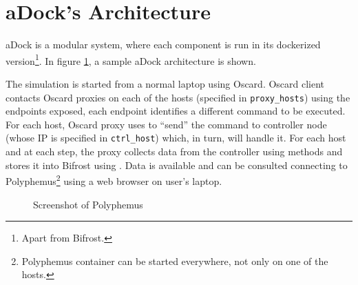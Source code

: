 \section{aDock's Architecture}
\label{sec:adock_arch}
aDock is a modular system, where each component is run in its dockerized version\footnote{Apart from Bifrost.}. In figure \ref{fig:adock_arch}, a sample aDock architecture is shown.

The simulation is started from a normal laptop using Oscard. Oscard client contacts Oscard proxies on each of the hosts (specified in \texttt{proxy\_hosts}) using the endpoints exposed, each endpoint identifies a different command to be executed. For each host, Oscard proxy uses  to ``send'' the command to controller node (whose IP is specified in \texttt{ctrl\_host}) which, in turn, will handle it. For each host and at each step, the proxy collects data from the controller using  methods and stores it into Bifrost using . Data is available and can be consulted connecting to Polyphemus\footnote{Polyphemus container can be started everywhere, not only on one of the hosts.} using a web browser on user's laptop.  

\begin{figure}[H]
\label{fig:adock_arch}
\caption{Screenshot of Polyphemus}
\end{figure}